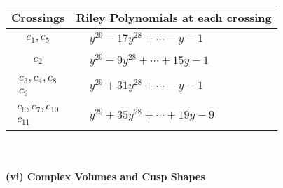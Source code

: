 \documentclass[1p]{elsarticle_modified}
\theoremstyle{definition}
\begin{document}
\begin{tabular}{m{50pt}|m{274pt}}
Crossings & \hspace{64pt}Riley Polynomials at each crossing \\
\hline $$\begin{aligned}c_{1},c_{5}\end{aligned}$$&$\begin{aligned}
&y^{29}-17 y^{28}+\cdots- y-1
\end{aligned}$\\
\hline $$\begin{aligned}c_{2}\end{aligned}$$&$\begin{aligned}
&y^{29}-9 y^{28}+\cdots+15 y-1
\end{aligned}$\\
\hline $$\begin{aligned}c_{3},c_{4},c_{8}\\c_{9}\end{aligned}$$&$\begin{aligned}
&y^{29}+31 y^{28}+\cdots- y-1
\end{aligned}$\\
\hline $$\begin{aligned}c_{6},c_{7},c_{10}\\c_{11}\end{aligned}$$&$\begin{aligned}
&y^{29}+35 y^{28}+\cdots+19 y-9
\end{aligned}$\\
\hline
\end{tabular}\\~\\
\newpage\flushleft \textbf{(vi) Complex Volumes and Cusp Shapes}
\end{document}
